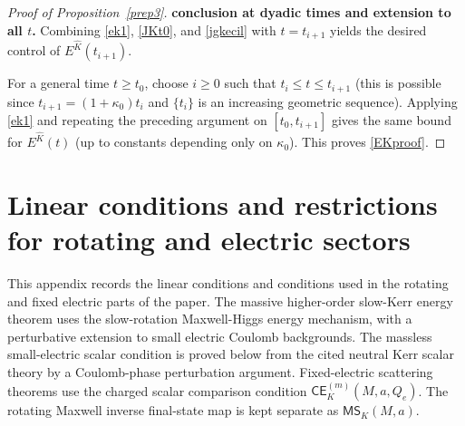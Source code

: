 \documentclass[11pt]{article}
\numberwithin{equation}{section}
\theoremstyle{plain}
\theoremstyle{definition}
\theoremstyle{remark}
\newcommand{\CElec}{\mathsf{CE}}
\newcommand{\MScat}{\mathsf{MS}}
\begin{document}
\begin{proof}[Proof of Proposition~\ref{prep3}]
\medskip
\noindent\textbf{conclusion at dyadic times and extension to all $t$.}
Combining \eqref{ek1}, \eqref{JKt0}, and \eqref{jgkecil} with $t=t_{i+1}$ yields the desired control of $E^{\hat K}(t_{i+1})$.

For a general time $t\ge t_{0}$, choose $i\ge 0$ such that $t_{i}\le t\le t_{i+1}$ (this is possible since $t_{i+1}=(1+\kappa_0)t_i$ and $\{t_i\}$ is an increasing geometric sequence).
Applying \eqref{ek1} and repeating the preceding argument on $[t_{0},t_{i+1}]$ gives the same bound for $E^{\hat K}(t)$ (up to constants depending only on $\kappa_0$).
This proves \eqref{EKproof}.
\end{proof}





\section{Linear conditions and restrictions for rotating and electric sectors}\label{app:kerr-linear-interface-modules}

This appendix records the linear conditions and conditions used in the rotating and fixed electric parts of the paper.  The massive higher-order slow-Kerr energy theorem uses the slow-rotation Maxwell-Higgs energy mechanism, with a perturbative extension to small electric Coulomb backgrounds.  The massless small-electric scalar condition is proved below from the cited neutral Kerr scalar theory by a Coulomb-phase perturbation argument.  Fixed-electric scattering theorems use the charged scalar comparison condition \(\CElec^{(m)}_K(M,a,Q_e)\).  The rotating Maxwell inverse final-state map is kept separate as \(\MScat_K(M,a)\).
\end{document}
